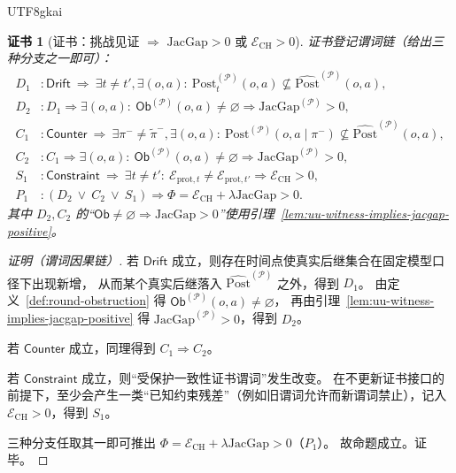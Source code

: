 \documentclass[12pt]{article}
\newtheorem{Certificate}{证书}[section]
\newcommand{\JacGap}{\ensuremath{\mathrm{JacGap}}} %
\begin{document}
\begin{CJK*}{UTF8}{gkai}
\begin{Certificate}[证书：挑战见证 $\Rightarrow$ $\JacGap>0$ 或 $\mathcal{E}_{\mathrm{CH}}>0$]
\label{cert:challenge-implies-phi-pressure}
证书登记谓词链（给出三种分支之一即可）：
\[
\begin{aligned}
  D_1 &: \mathsf{Drift}\ \Rightarrow\ \exists t\neq t',\exists(o,a):\ \mathrm{Post}^{(\mathcal{P})}_{t}(o,a)
    \not\subseteq \widehat{\mathrm{Post}}^{(\mathcal{P})}(o,a),\\
  D_2 &: D_1\Rightarrow \exists(o,a):\ \mathsf{Ob}^{(\mathcal{P})}(o,a)\neq\varnothing\Rightarrow \JacGap^{(\mathcal{P})}
    >0,\\
  C_1 &: \mathsf{Counter}\ \Rightarrow\ \exists\pi^{-}\neq\tilde\pi^{-},\exists(o,a):\ \mathrm{Post}^{(\mathcal{P})}(o,
    a\mid \pi^{-})\not\subseteq \widehat{\mathrm{Post}}^{(\mathcal{P})}(o,a),\\
  C_2 &: C_1\Rightarrow \exists(o,a):\ \mathsf{Ob}^{(\mathcal{P})}(o,a)\neq\varnothing\Rightarrow \JacGap^{(\mathcal{P})}
    >0,\\
  S_1 &: \mathsf{Constraint}\ \Rightarrow\ \exists t\neq t':\ \mathcal{E}_{\mathrm{prot},t}\neq \mathcal{E}
    _{\mathrm{prot},t'}\Rightarrow \mathcal{E}_{\mathrm{CH}}>0,\\
  P_1 &: (D_2\ \vee\ C_2\ \vee\ S_1)\Rightarrow \Phi=\mathcal{E}_{\mathrm{CH}}+\lambda\JacGap>0.
\end{aligned}
\]
其中 $D_2,C_2$ 的“$\mathsf{Ob}\neq\varnothing\Rightarrow\JacGap>0$”使用引理~\ref{lem:uu-witness-implies-jacgap-positive}。
\end{Certificate}

\begin{proof}[证明（谓词因果链）]
若 $\mathsf{Drift}$ 成立，则存在时间点使真实后继集合在固定模型口径下出现新增，
从而某个真实后继落入 $\widehat{\mathrm{Post}}^{(\mathcal{P})}$ 之外，得到 $D_1$。
由定义~\ref{def:round-obstruction} 得 $\mathsf{Ob}^{(\mathcal{P})}(o,a)\neq\varnothing$，
再由引理~\ref{lem:uu-witness-implies-jacgap-positive} 得 $\JacGap^{(\mathcal{P})}>0$，得到 $D_2$。

若 $\mathsf{Counter}$ 成立，同理得到 $C_1\Rightarrow C_2$。

若 $\mathsf{Constraint}$ 成立，则“受保护一致性证书谓词”发生改变。
在不更新证书接口的前提下，至少会产生一类“已知约束残差”（例如旧谓词允许而新谓词禁止），记入 $\mathcal{E}_{\mathrm{CH}}>0$，得到 $S_1$。

三种分支任取其一即可推出 $\Phi=\mathcal{E}_{\mathrm{CH}}+\lambda\JacGap>0$（$P_1$）。
故命题成立。证毕。
\end{proof}


\end{CJK*}
\end{document}
